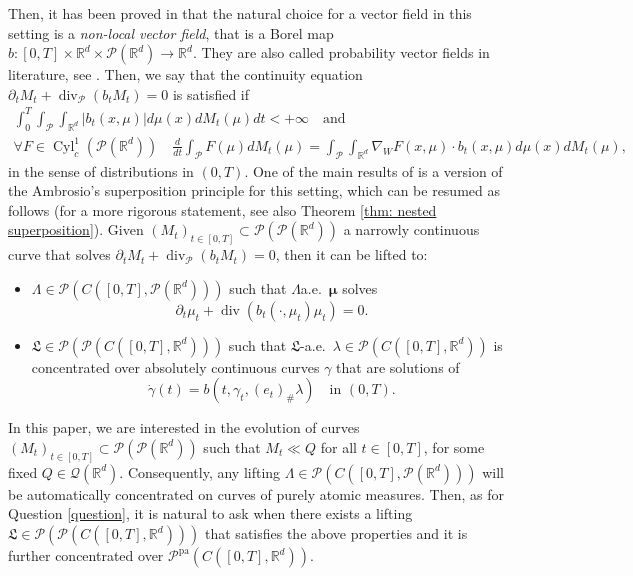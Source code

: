 \documentclass[10pt,leqno]{amsart}
\numberwithin{equation}{section}
\newcommand{\R}{\mathbb{R}}
\newcommand{\PP}{\mathcal{P}}
\newcommand{\PPpa}{\PP^{\operatorname{pa}}}
\begin{document}
Then, it has been proved in \cite[Section 4]{pinzisavare2025} that the natural choice for a vector field in this setting is a \textit{non-local vector field}, that is a Borel map $b:[0,T]\times \R^d\times \PP(\R^d) \to \R^d$. They are also called probability vector fields in literature, see \cite{CSS22, cavagnari2023dissipative}. Then, we say that the continuity equation $\partial_t M_t + \operatorname{div}_\PP(b_tM_t) = 0$ is satisfied if 
\begin{equation}\label{eq: CERM intro}
    \begin{gathered}
        \int_0^T \int_{\PP}\int_{\R^d} |b_t(x,\mu)|d\mu(x) dM_t(\mu) dt <+\infty \quad  \text{and} \\  \forall F \in \operatorname{Cyl}_c^1(\PP(\R^d))\quad 
        \frac{d}{dt} \int_{\PP} F(\mu) dM_t(\mu)  = \int_{\PP}\int_{\R^d} \nabla_W F(x,\mu) \cdot b_t(x,\mu) d\mu(x) dM_t(\mu),
    \end{gathered}   
    \end{equation}
in the sense of distributions in $(0,T)$. One of the main results of \cite{pinzisavare2025} is a version of the Ambrosio's superposition principle for this setting, which can be resumed as follows (for a more rigorous statement, see also Theorem \ref{thm: nested superposition}). Given $(M_t)_{t\in[0,T]} \subset \PP(\PP(\R^d))$ a narrowly continuous curve that solves $\partial_tM_t + \operatorname{div}_\PP(b_tM_t) = 0$, then it can be lifted to:
\begin{itemize}
    \item$\Lambda \in \PP(C([0,T],\PP(\R^d)))$ such that $\Lambda$a.e.~$\boldsymbol{\mu}$ solves 
        \begin{equation}\label{eq: nlce intro}
        \partial_t\mu_t + \operatorname{div}(b_t(\cdot,\mu_t)\mu_t)=0.
        \end{equation}
        \item $\mathfrak{L}\in \PP(\PP(C([0,T],\R^d)))$ such that $\mathfrak{L}$-a.e.~$\lambda\in \PP(C([0,T],\R^d))$
        is concentrated over 
        absolutely continuous curves 
        $\gamma$ that are solutions of
        \begin{equation}\label{eq: sps intro}
        \dot{\gamma}(t) = b(t,\gamma_t,(e_t)_\#\lambda)\quad\text{in }(0,T).
        \end{equation}
\end{itemize}

In this paper, we are interested in the evolution of curves $(M_t)_{t\in[0,T]}\subset \PP(\PP(\R^d))$ such that $M_t \ll Q$ for all $t\in [0,T]$, for some fixed $Q \in \mathcal{Q}(\R^d)$. Consequently, any lifting $\Lambda \in \PP(C([0,T],\PP(\R^d)))$ will be automatically concentrated on curves of purely atomic measures. Then, as for Question \ref{question}, it is natural to ask when there exists a lifting $\mathfrak{L}\in \PP(\PP(C([0,T],\R^d)))$ that satisfies the above properties and it is further concentrated over $\PPpa(C([0,T],\R^d))$. 
\end{document}
